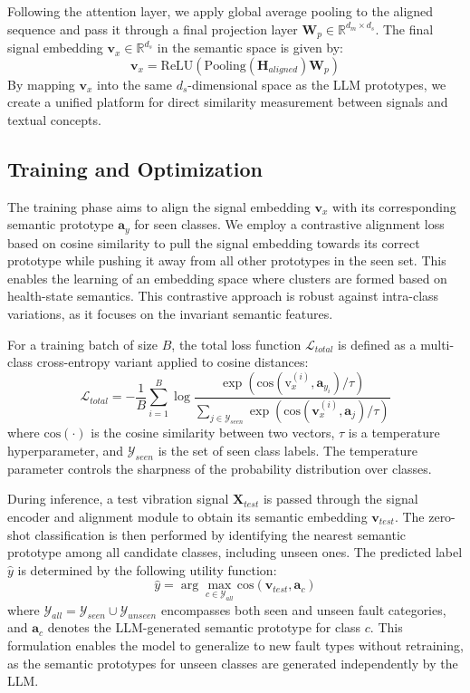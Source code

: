 Following the attention layer, we apply global average pooling to the aligned sequence and pass it through a final projection layer $\mathbf{W}_p \in \mathbb{R}^{d_m \times d_s}$. The final signal embedding $\mathbf{v}_x \in \mathbb{R}^{d_s}$ in the semantic space is given by:
\begin{equation}
\mathbf{v}_x = \text{ReLU}(\text{Pooling}(\mathbf{H}_{aligned}) \mathbf{W}_p)
\end{equation}
By mapping $\mathbf{v}_x$ into the same $d_s$-dimensional space as the LLM prototypes, we create a unified platform for direct similarity measurement between signals and textual concepts.

\subsection{Training and Optimization}
The training phase aims to align the signal embedding $\mathbf{v}_x$ with its corresponding semantic prototype $\mathbf{a}_{y}$ for seen classes. We employ a contrastive alignment loss \cite{chen2020simple} based on cosine similarity to pull the signal embedding towards its correct prototype while pushing it away from all other prototypes in the seen set. This enables the learning of an embedding space where clusters are formed based on health-state semantics. This contrastive approach is robust against intra-class variations, as it focuses on the invariant semantic features.

For a training batch of size $B$, the total loss function $\mathcal{L}_{total}$ is defined as a multi-class cross-entropy variant applied to cosine distances:
\begin{equation}
\mathcal{L}_{total} = -\frac{1}{B} \sum_{i=1}^{B} \log \frac{\exp(\text{cos}(\text{v}_x^{(i)}, \mathbf{a}_{y_i}) / \tau)}{\sum_{j \in \mathcal{Y}_{seen}} \exp(\text{cos}(\mathbf{v}_x^{(i)}, \mathbf{a}_j) / \tau)}
\end{equation}
where $\text{cos}(\cdot)$ is the cosine similarity between two vectors, $\tau$ is a temperature hyperparameter, and $\mathcal{Y}_{seen}$ is the set of seen class labels. The temperature parameter controls the sharpness of the probability distribution over classes.

During inference, a test vibration signal $\mathbf{X}_{test}$ is passed through the signal encoder and alignment module to obtain its semantic embedding $\mathbf{v}_{test}$. The zero-shot classification is then performed by identifying the nearest semantic prototype among all candidate classes, including unseen ones. The predicted label $\hat{y}$ is determined by the following utility function:
\begin{equation}
\hat{y} = \arg\max_{c \in \mathcal{Y}_{all}} \text{cos}(\mathbf{v}_{test}, \mathbf{a}_c)
\end{equation}
where $\mathcal{Y}_{all} = \mathcal{Y}_{seen} \cup \mathcal{Y}_{unseen}$ encompasses both seen and unseen fault categories, and $\mathbf{a}_c$ denotes the LLM-generated semantic prototype for class $c$. This formulation enables the model to generalize to new fault types without retraining, as the semantic prototypes for unseen classes are generated independently by the LLM.

